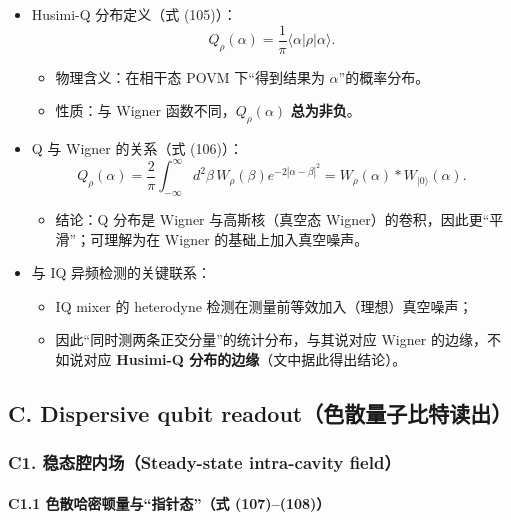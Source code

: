 \documentclass[12pt,a4paper,oneside]{ctexbook}
\providecommand{\tightlist}{%
  \setlength{\itemsep}{0pt}\setlength{\parskip}{0pt}}
\let\oldparagraph\paragraph
\renewcommand{\paragraph}[1]{\oldparagraph{#1}\mbox{}}
\begin{document}
\begin{itemize}
\tightlist
\item
  Husimi-Q 分布定义（式 (105)）： \[
  Q_\rho(\alpha)=\frac{1}{\pi}\langle \alpha\lvert\rho\rvert \alpha\rangle .
  \]

  \begin{itemize}
  \tightlist
  \item
    物理含义：在相干态 POVM 下``得到结果为 \(\alpha\)''的概率分布。
  \item
    性质：与 Wigner 函数不同，\(Q_\rho(\alpha)\) \textbf{总为非负}。
  \end{itemize}
\item
  Q 与 Wigner 的关系（式 (106)）： \[
  Q_\rho(\alpha)=\frac{2}{\pi}\int_{-\infty}^{\infty}d^2\beta\,
  W_\rho(\beta)e^{-2|\alpha-\beta|^2}
  =W_\rho(\alpha)*W_{\lvert 0\rangle}(\alpha).
  \]

  \begin{itemize}
  \tightlist
  \item
    结论：Q 分布是 Wigner 与高斯核（真空态
    Wigner）的卷积，因此更``平滑''；可理解为在 Wigner
    的基础上加入真空噪声。
  \end{itemize}
\item
  与 IQ 异频检测的关键联系：

  \begin{itemize}
  \tightlist
  \item
    IQ mixer 的 heterodyne 检测在测量前等效加入（理想）真空噪声；
  \item
    因此``同时测两条正交分量''的统计分布，与其说对应 Wigner
    的边缘，不如说对应 \textbf{Husimi-Q
    分布的边缘}（文中据此得出结论）。
  \end{itemize}
\end{itemize}


\subsection{C. Dispersive qubit
readout（色散量子比特读出）}\label{c.-dispersive-qubit-readoutux8272ux6563ux91cfux5b50ux6bd4ux7279ux8bfbux51fa}

\subsubsection{C1. 稳态腔内场（Steady-state intra-cavity
field）}\label{c1.-ux7a33ux6001ux8154ux5185ux573asteady-state-intra-cavity-field}

\paragraph{C1.1 色散哈密顿量与``指针态''（式
(107)--(108)）}\label{c1.1-ux8272ux6563ux54c8ux5bc6ux987fux91cfux4e0eux6307ux9488ux6001ux5f0f-107108}
\end{document}
